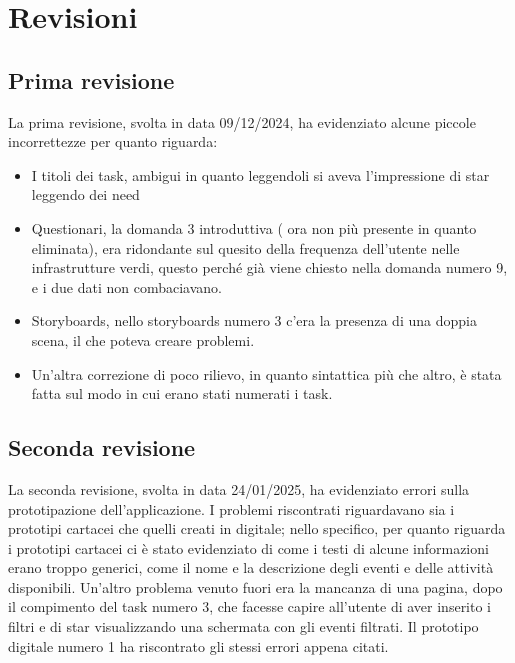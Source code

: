 \chapter{Revisioni}
\section{Prima revisione}
La prima revisione, svolta in data 09/12/2024, ha evidenziato alcune piccole incorrettezze per quanto riguarda:
\begin{itemize}
    \item I titoli dei task, ambigui in quanto leggendoli si aveva l’impressione di star leggendo dei need
    \item Questionari, la domanda 3 introduttiva ( ora non più presente in quanto eliminata), era ridondante sul quesito della frequenza dell’utente nelle infrastrutture verdi, questo perché già viene chiesto nella domanda numero 9, e i due dati non combaciavano.
    \item Storyboards, nello storyboards numero 3 c’era la presenza di una doppia scena, il che poteva creare problemi.
    \item Un’altra correzione di poco rilievo, in quanto sintattica più che altro, è stata fatta sul modo in cui erano stati numerati i task.
\end{itemize}

\section{Seconda revisione}
La seconda revisione, svolta in data 24/01/2025, ha evidenziato errori sulla prototipazione dell’applicazione.
I problemi riscontrati riguardavano sia i prototipi cartacei che quelli creati in digitale; nello specifico, per quanto riguarda i prototipi cartacei ci è stato evidenziato di come i testi di alcune informazioni erano troppo generici, come il nome e la descrizione degli eventi e delle attività disponibili.
Un’altro problema venuto fuori era la mancanza di una pagina, dopo il compimento del task numero 3, che facesse capire all’utente di aver inserito i filtri e di star visualizzando una schermata con gli eventi filtrati.
Il prototipo digitale numero 1 ha riscontrato gli stessi errori appena citati.